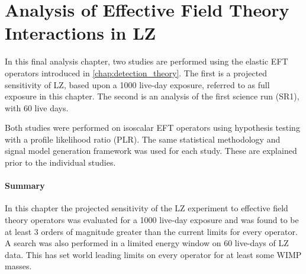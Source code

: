 \chapter{Analysis of Effective Field Theory Interactions in LZ}
\label{chap:analysis_eft_work}
In this final analysis chapter, two studies are performed using the elastic EFT operators introduced in \autoref{chap:detection_theory}.
The first is a projected sensitivity of LZ, based upon a 1000 live-day exposure, referred to as full exposure in this chapter.
The second is an analysis of the first science run (SR1), with 60 live days.
\par
Both studies were performed on isoscalar EFT operators using hypothesis testing with a profile likelihood ratio (PLR).
The same statistical methodology and signal model generation framework was used for each study.
These are explained prior to the individual studies.



%






\clearpage


%

%

\subsubsection*{Summary}
\par
In this chapter the projected sensitivity of the LZ experiment to effective field theory operators was evaluated for a 1000 live-day exposure and was found to be at least 3 orders of magnitude greater than the current limits for every operator.
A search was also performed in a limited energy window on 60 live-days of LZ data.
This has set world leading limits on every operator for at least some WIMP masses.